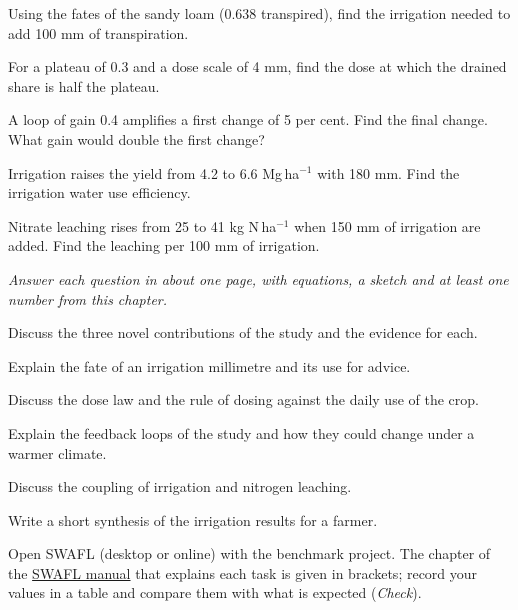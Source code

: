 \begin{exlist}
\item Using the fates of the sandy loam (0.638 transpired), find the irrigation needed to add 100 mm of transpiration.\exans{157 mm}
\item For a plateau of 0.3 and a dose scale of 4 mm, find the dose at which the drained share is half the plateau.\exans{2.8 mm}
\item A loop of gain 0.4 amplifies a first change of 5 per cent. Find the final change. What gain would double the first change?
\item Irrigation raises the yield from 4.2 to 6.6 Mg\,ha$^{-1}$ with 180 mm. Find the irrigation water use efficiency.
\item Nitrate leaching rises from 25 to 41 kg N\,ha$^{-1}$ when 150 mm of irrigation are added. Find the leaching per 100 mm of irrigation.
\end{exlist}
{\small\itshape Answer each question in about one page, with equations, a sketch and at least one number from this chapter.}\par\vspace{3pt}
\begin{exlist}
\item Discuss the three novel contributions of the study and the evidence for each.
\item Explain the fate of an irrigation millimetre and its use for advice.
\item Discuss the dose law and the rule of dosing against the daily use of the crop.
\item Explain the feedback loops of the study and how they could change under a warmer climate.
\item Discuss the coupling of irrigation and nitrogen leaching.
\item Write a short synthesis of the irrigation results for a farmer.
\end{exlist}
{\small Open SWAFL (desktop or online) with the benchmark project. The chapter of the \href{https://github.com/halilunaziru73-creator/Coupled-Water-Fluxes-Pore-Scale-Dynamics-Precision-Irrigation-Mulching-Feedback-Loops/raw/main/Software/v1.1.0/SWAFL_Desktop/docs/manual_v1.1.0/SWAFL_Manual_v1.1.0.pdf}{SWAFL manual} that explains each task is given in brackets; record your values in a table and compare them with what is expected (\emph{Check}).}\par\vspace{3pt}
